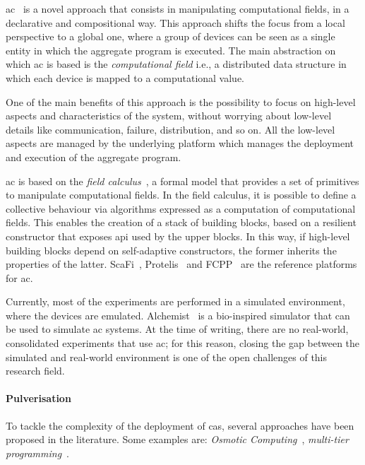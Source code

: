 \documentclass[12pt]{article}
\begin{document}
\ac{ac}~\cite{DBLP:journals/computer/BealPV15} is a novel approach that consists in manipulating computational fields,
in a declarative and compositional way.
%
This approach shifts the focus from a local perspective to a global one,
where a group of devices can be seen as a single entity in which the aggregate program is executed.
%
The main abstraction on which \ac{ac} is based is the \emph{computational field} i.e.,
a distributed data structure in which each device is mapped to a computational value.

One of the main benefits of this approach is the possibility to focus on high-level aspects and characteristics of the system,
without worrying about low-level details like communication, failure, distribution, and so on.
%
All the low-level aspects are managed by the underlying platform which manages the deployment and execution of the aggregate program.

\ac{ac} is based on the \emph{field calculus}~\cite{DBLP:journals/tocl/AudritoVDPB19},
a formal model that provides a set of primitives to manipulate computational fields.
%
In the field calculus,
it is possible to define a collective behaviour via algorithms expressed as a computation of computational fields.
%
This enables the creation of a stack of building blocks,
based on a resilient constructor that exposes \ac{api} used by the upper blocks.
%
In this way,
if high-level building blocks depend on self-adaptive constructors,
the former inherits the properties of the latter.
%
ScaFi~\cite{DBLP:journals/softx/CasadeiVAP22}, Protelis~\cite{DBLP:conf/sac/PianiniVB15} and FCPP~\cite{DBLP:conf/acsos/Audrito20} are the reference platforms for \ac{ac}.

Currently, most of the experiments are performed in a simulated environment,
where the devices are emulated.
%
Alchemist~\cite{DBLP:journals/jos/PianiniMV13} is a bio-inspired simulator that can be used to simulate \ac{ac} systems.
%
At the time of writing,
there are no real-world, consolidated experiments that use \ac{ac};
for this reason,
closing the gap between the simulated and real-world environment is one of the open challenges of this research field.

\paragraph{Pulverisation}
To tackle the complexity of the deployment of \ac{cas},
several approaches have been proposed in the literature.
%
Some examples are: \emph{Osmotic Computing}~\cite{DBLP:journals/tiot/NehaPSSG22}, \emph{multi-tier programming}~\cite{DBLP:journals/csur/WeisenburgerWS20}.
\end{document}
